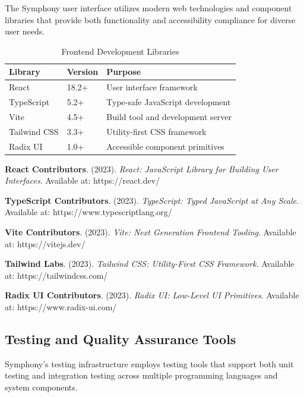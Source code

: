 The Symphony user interface utilizes modern web technologies and component libraries that provide both functionality and accessibility compliance for diverse user needs.

\begin{table}[ht]
\centering
\begin{tabular}{@{}lll@{}}
\toprule
\textbf{Library} & \textbf{Version} & \textbf{Purpose} \\
\midrule
React & 18.2+ & User interface framework \\
TypeScript & 5.2+ & Type-safe JavaScript development \\
Vite & 4.5+ & Build tool and development server \\
Tailwind CSS & 3.3+ & Utility-first CSS framework \\
Radix UI & 1.0+ & Accessible component primitives \\
\bottomrule
\end{tabular}
\caption{Frontend Development Libraries}
\end{table}

\begin{compactlist}
    \item \textbf{React Contributors}. (2023). \textit{React: JavaScript Library for Building User Interfaces}. Available at: https://react.dev/
    \item \textbf{TypeScript Contributors}. (2023). \textit{TypeScript: Typed JavaScript at Any Scale}. Available at: https://www.typescriptlang.org/
    \item \textbf{Vite Contributors}. (2023). \textit{Vite: Next Generation Frontend Tooling}. Available at: https://vitejs.dev/
    \item \textbf{Tailwind Labs}. (2023). \textit{Tailwind CSS: Utility-First CSS Framework}. Available at: https://tailwindcss.com/
    \item \textbf{Radix UI Contributors}. (2023). \textit{Radix UI: Low-Level UI Primitives}. Available at: https://www.radix-ui.com/
\end{compactlist}

\subsection*{Testing and Quality Assurance Tools}

Symphony's testing infrastructure employs testing tools that support both unit testing and integration testing across multiple programming languages and system components.

